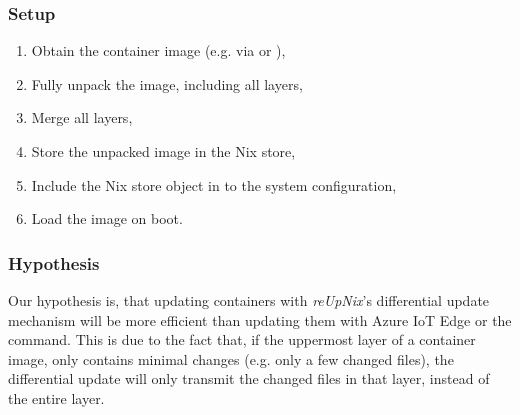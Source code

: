 \subsubsection{Setup}
\begin{enumerate}
    \item Obtain the container image (e.g. via  or ),
    \item Fully unpack the image, including all layers,
    \item Merge all layers,
    \item Store the unpacked image in the Nix store,
    \item Include the Nix store object in to the system configuration,
    \item Load the image on boot.
\end{enumerate}
\subsubsection{Hypothesis}
Our hypothesis is, that updating containers with \textit{reUpNix}'s differential
update mechanism will be more efficient than updating them with Azure IoT Edge or
the  command. This is due to the fact that, if the uppermost
layer of a container image, only contains minimal changes (e.g. only a few
changed files), the differential update will only transmit the changed files in
that layer, instead of the entire layer.
